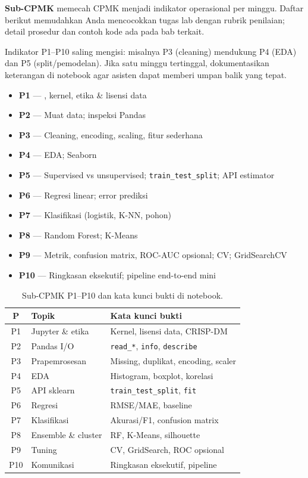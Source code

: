 \documentclass[../main.tex]{subfiles}
\begin{document}
\textbf{Sub-CPMK} memecah CPMK menjadi indikator operasional per minggu. Daftar berikut memudahkan Anda mencocokkan tugas lab dengan rubrik penilaian; detail prosedur dan contoh kode ada pada bab terkait.

Indikator P1--P10 saling mengisi: misalnya P3 (cleaning) mendukung P4 (EDA) dan P5 (split/pemodelan). Jika satu minggu tertinggal, dokumentasikan keterangan di notebook agar asisten dapat memberi umpan balik yang tepat.

\begin{itemize}[leftmargin=*]
  \item \textbf{P1} --- \jupyter{}, kernel, etika \& lisensi data
  \item \textbf{P2} --- Muat data; inspeksi Pandas
  \item \textbf{P3} --- Cleaning, encoding, scaling, fitur sederhana
  \item \textbf{P4} --- EDA; Seaborn
  \item \textbf{P5} --- Supervised vs unsupervised; \texttt{train\_test\_split}; API estimator
  \item \textbf{P6} --- Regresi linear; error prediksi
  \item \textbf{P7} --- Klasifikasi (logistik, K-NN, pohon)
  \item \textbf{P8} --- Random Forest; K-Means
  \item \textbf{P9} --- Metrik, confusion matrix, ROC-AUC opsional; CV; GridSearchCV
  \item \textbf{P10} --- Ringkasan eksekutif; pipeline end-to-end mini
\end{itemize}

\begin{table}[htbp]
\centering
\caption{Sub-CPMK P1--P10 dan kata kunci bukti di notebook.}
\label{tab:subcpmk-kunci}
\footnotesize
\begin{tabular}{@{}clp{6.8cm}@{}}
\toprule
\textbf{P} & \textbf{Topik} & \textbf{Kata kunci bukti} \\
\midrule
P1 & Jupyter \& etika & Kernel, lisensi data, CRISP-DM \\
P2 & Pandas I/O & \texttt{read\_*}, \texttt{info}, \texttt{describe} \\
P3 & Prapemrosesan & Missing, duplikat, encoding, scaler \\
P4 & EDA & Histogram, boxplot, korelasi \\
P5 & API sklearn & \texttt{train\_test\_split}, \texttt{fit} \\
P6 & Regresi & RMSE/MAE, baseline \\
P7 & Klasifikasi & Akurasi/F1, confusion matrix \\
P8 & Ensemble \& cluster & RF, K-Means, silhouette \\
P9 & Tuning & CV, GridSearch, ROC opsional \\
P10 & Komunikasi & Ringkasan eksekutif, pipeline \\
\bottomrule
\end{tabular}
\end{table}
\end{document}
